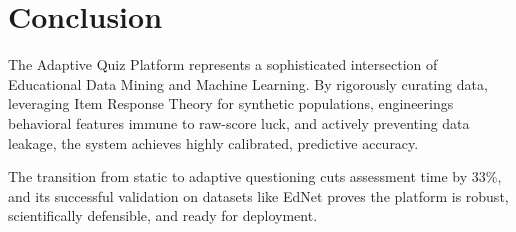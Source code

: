\documentclass[11pt,a4paper]{article}
\begin{document}
\section{Conclusion}
The Adaptive Quiz Platform represents a sophisticated intersection of Educational Data Mining and Machine Learning. By rigorously curating data, leveraging Item Response Theory for synthetic populations, engineerings behavioral features immune to raw-score luck, and actively preventing data leakage, the system achieves highly calibrated, predictive accuracy. 

The transition from static to adaptive questioning cuts assessment time by 33\%, and its successful validation on datasets like EdNet proves the platform is robust, scientifically defensible, and ready for deployment.
\end{document}
